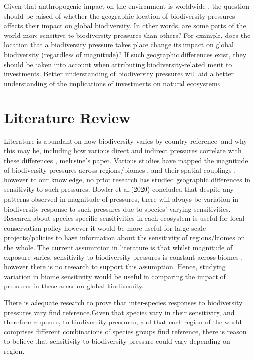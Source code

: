 \documentclass[11pt, a4paper, titlepage]{article}
\begin{document}
   	 Given that anthropogenic impact on the environment is worldwide \cite{plumptre2021might}, the question should be raised of whether the geographic location of biodiversity pressures affects their impact on global biodiversity. In other words, are some parts of the world more sensitive to biodiversity pressures than others? For example, does the location that a biodiversity pressure takes place change its impact on global biodiversity (regardless of magnitude)? If such geographic differences exist, they should be taken into account when attributing biodiversity-related merit to investments. Better understanding of biodiversity pressures will aid a better understanding of the implications of investments on natural ecosystems . \newline
   	
   	\section*{Literature Review}
   	Literature is abundant on how biodiversity varies by country {reference}, and why this may be, including how various direct and indirect pressures correlate with these differences \cite{sunday2015species}, \cite{ament2019compatibility} {melusine's paper}. 
	Various studies have mapped the magnitude of biodiversity pressures across regions/biomes \newline \cite{millennium2005ecosystems} \cite{sala2000global}, and their spatial couplings \cite{bowler2020mapping}, however to our knowledge, no prior research has studied geographic differences in sensitivity to such pressures. Bowler et al.(2020) concluded that despite any patterns observed in magnitude of pressures, there will always be variation in biodiversity response to such pressures due to species' varying sensitivities. Research about species-specific sensitivities in each ecosystem is useful for local conservation policy however it would be more useful for large scale projects/policies to have information about the sensitivity of regions/biomes on the whole. The current assumption in literature is that whilst magnitude of exposure varies, sensitivity to biodiversity pressures is constant across biomes \cite{sala2000global}, however there is no research to support this assumption. Hence, studying variation in biome sensitivity would be useful in comparing the impact of pressures in these areas on global biodiversity.  \newline
	
	There is adequate research to prove that inter-species responses to biodiversity pressures vary {find reference}.Given that species vary in their sensitivity, and therefore response, to biodiversity pressures, and that each region of the world comprises different combinations of species groups {find reference}, there is reason to believe that sensitivity to biodiversity pressure could vary depending on region. 
	
\end{document}
